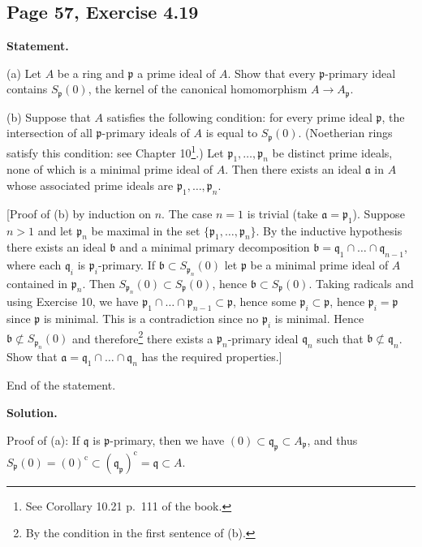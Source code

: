 \documentclass[parskip=half,fontsize=12pt]{scrartcl}%
\newcommand{\oo}{\operatorname}\newcommand{\ooo}{\operatorname*}
\newcommand{\mf}{\mathfrak}
\newcommand{\ppp}{\mf p}
\newcommand{\qqq}{\mf q}
\begin{document}
\subsection{Page 57, Exercise 4.19}%

\textbf{Statement.}

(a) Let $A$ be a ring and $\mathfrak p$ a prime ideal of $A$. Show that every $\mathfrak p$-primary ideal contains $S_{\mathfrak p}(0)$, the kernel of the canonical homomorphism $A\to A_{\mathfrak p}$.

(b) Suppose that $A$ satisfies the following condition: for every prime ideal $\mathfrak p$, the intersection of all $\mathfrak p$-primary ideals of $A$ is equal to $S_{\mathfrak p}(0)$. (Noetherian rings satisfy this condition: see Chapter 10\footnote{See Corollary 10.21 p.~111 of the book.}.) Let $\mathfrak p_1,\dots,\mathfrak p_n$ be distinct prime ideals, none of which is a minimal prime ideal of $A$. Then there exists an ideal $\mathfrak a$ in $A$ whose associated prime ideals are $\mathfrak p_1,\dots,\mathfrak p_n$.

[Proof of (b) by induction on $n$. The case $n=1$ is trivial (take $\mathfrak a=\mathfrak p_1$). Suppose $n>1$ and let $\mathfrak p_n$ be maximal in the set $\{\mathfrak p_1,\dots,\mathfrak p_n\}$. By the inductive hypothesis there exists an ideal $\mathfrak b$ and a minimal primary decomposition $\mathfrak b=\mathfrak q_1\cap\dots\cap\mathfrak q_{n-1}$, where each $\mathfrak q_i$ is $\mathfrak p_i$-primary. If $\mathfrak b\subset S_{\mathfrak p_n}(0)$ let $\mathfrak p$ be a minimal prime ideal of $A$ contained in $\mathfrak p_n$. Then $S_{\mathfrak p_n}(0)\subset S_{\mathfrak p}(0)$, hence $\mathfrak b\subset S_{\mathfrak p}(0)$. Taking radicals and using Exercise 10, we have $\mathfrak p_1\cap\dots\cap\mathfrak p_{n-1}\subset\mathfrak p$, hence some $\mathfrak p_i\subset \mathfrak p$, hence $\mathfrak p_i=\mathfrak p$ since $\mathfrak p$ is minimal. This is a contradiction since no $\mathfrak p_i$ is minimal. Hence $\mathfrak b\not\subset S_{\mathfrak p_n}(0)$ and therefore\footnote{By the condition in the first sentence of (b).} there exists a $\mathfrak p_n$-primary ideal $\mathfrak q_n$ such that $\mathfrak b\not\subset\mathfrak q_n$. Show that $\mathfrak a=\mathfrak q_1\cap\dots\cap\mathfrak q_n$ has the required properties.]

End of the statement.

\textbf{Solution.}

Proof of (a): If $\qqq$ is $\ppp$-primary, then we have $(0)\subset\qqq_\ppp\subset A_\ppp$, and thus $S_\ppp(0)=(0)^{\oo c}\subset(\qqq_\ppp)^{\oo c}=\qqq\subset A$. 
\end{document}
